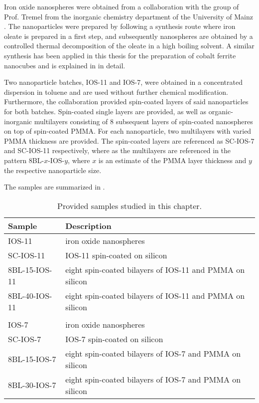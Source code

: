 \documentclass[\main/dresen_thesis.tex]{subfiles}
\begin{document}
  Iron oxide nanospheres were obtained from a collaboration with the group of Prof. Tremel from the inorganic chemistry department of the University of Mainz \cite{Wichmann_2016_Synth}.
  The nanoparticles were prepared by following a synthesis route where iron oleate is prepared in a first step, and subsequently nanospheres are obtained by a controlled thermal decomposition of the oleate in a high boiling solvent.
  A similar synthesis has been applied in this thesis for the preparation of cobalt ferrite nanocubes and is explained in  in detail.

  Two nanoparticle batches, IOS-11 and IOS-7, were obtained in a concentrated dispersion in toluene and are used without further chemical modification.
  Furthermore, the collaboration provided spin-coated layers of said nanoparticles for both batches.
  Spin-coated single layers are provided, as well as organic-inorganic multilayers consisting of 8 subsequent layers of spin-coated nanospheres on top of spin-coated PMMA.
  For each nanoparticle, two multilayers with varied PMMA thickness are provided.
  The spin-coated layers are referenced as SC-IOS-7 and SC-IOS-11 respectively, where as the multilayers are referenced in the pattern 8BL-$x$-IOS-$y$, where $x$ is an estimate of the PMMA layer thickness and $y$ the respective nanoparticle size.

  The samples are summarized in .
  \begin{table}[!htbp]
    \centering
    \caption{\label{tab:looselyPackedNS:expMethods:samples}Provided samples studied in this chapter.}
    \begin{tabular}{ l | l }
      \textbf{Sample}  & Description \\
      \hline
      IOS-11        & iron oxide nanospheres\\
      SC-IOS-11     & IOS-11 spin-coated on silicon\\
      8BL-15-IOS-11 & eight spin-coated bilayers of IOS-11 and PMMA on silicon\\
      8BL-40-IOS-11 & eight spin-coated bilayers of IOS-11 and PMMA on silicon\\
      \\
      IOS-7         & iron oxide nanospheres\\
      SC-IOS-7      & IOS-7 spin-coated on silicon\\
      8BL-15-IOS-7  & eight spin-coated bilayers of IOS-7 and PMMA on silicon\\
      8BL-30-IOS-7  & eight spin-coated bilayers of IOS-7 and PMMA on silicon\\
      \hline
    \end{tabular}
  \end{table}
\end{document}
